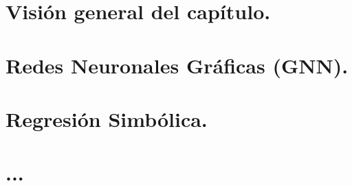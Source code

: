\section{Visión general del capítulo.}

\section{Redes Neuronales Gráficas (GNN).}

\section{Regresión Simbólica.}

\section{...}
